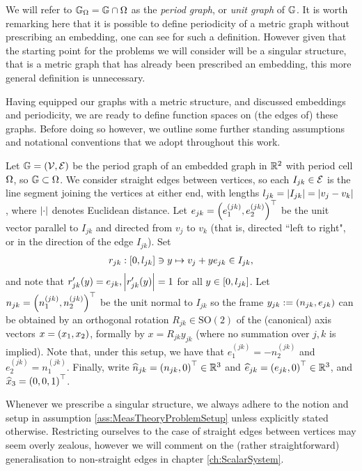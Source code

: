 We will refer to $\mathbb{G}_{\Omega} = \mathbb{G} \cap \Omega$ as the \emph{period graph}, or \emph{unit graph} of $\mathbb{G}$.
It is worth remarking here that it is possible to define periodicity of a metric graph without prescribing an embedding, one can see \cite[Chapter~4]{berkolaiko2013introduction} for such a definition.
However given that the starting point for the problems we will consider will be a singular structure, that is a metric graph that has already been prescribed an embedding, this more general definition is unnecessary.

Having equipped our graphs with a metric structure, and discussed embeddings and periodicity, we are ready to define function spaces on (the edges of) these graphs.
Before doing so however, we outline some further standing assumptions and notational conventions that we adopt throughout this work.
\begin{assumption} \label{ass:MeasTheoryProblemSetup}
	Let $\mathbb{G}=\left( \mathcal{V},\mathcal{E} \right)$ be the period graph of an embedded graph in $\mathbb{R}^2$ with period cell $\Omega$, so $\mathbb{G}\subset\Omega$.
	We consider straight edges between vertices, so each $I_{jk}\in \mathcal{E}$ is the line segment joining the vertices at either end, with lengths $l_{jk} = \left\lvert I_{jk} \right\rvert = \left\lvert v_j-v_k \right\rvert$, where $\left\lvert \cdot \right\rvert$ denotes Euclidean distance.
	Let $e_{jk} = \left( e_1^{(jk)}, e_2^{(jk)} \right)^\top$ be the unit vector parallel to $I_{jk}$ and directed from $v_j$ to $v_k$ (that is, directed ``left to right", or in the direction of the edge $I_{jk}$).
	Set
	\begin{align} \label{eq:EdgeParameterisation}
		r_{jk}:\left[ 0, l_{jk} \right] \ni y \mapsto v_j + ye_{jk} \in I_{jk},
	\end{align}
	and note that $r_{jk}'(y) = e_{jk}, \left\lvert r_{jk}'(y) \right\rvert=1$ for all $y\in\left[ 0, l_{jk} \right]$.
	Let $n_{jk} = \left( n_1^{(jk)}, n_2^{(jk)} \right)^\top$ be the unit normal to $I_{jk}$ so the frame $y_{jk} := \left( n_{jk}, e_{jk} \right)$ can be obtained by an orthogonal rotation $R_{jk}\in\mathrm{SO}(2)$ of the (canonical) axis vectors $x = \left( x_1, x_2 \right)$, formally by $x = R_{jk}y_{jk}$ (where no summation over $j,k$ is implied).
	Note that, under this setup, we have that $e_1^{(jk)} = - n_2^{(jk)}$ and $e_2^{(jk)} = n_1^{(jk)}$.
	Finally, write $\widehat{n}_{jk} = \left(  n_{jk}, 0  \right)^\top\in\mathbb{R}^3$ and $\widehat{e}_{jk} = \left(  e_{jk}, 0  \right)^\top\in\mathbb{R}^3$, and $\widehat{x}_3 = \left( 0,0,1 \right)^\top$.
\end{assumption}
Whenever we prescribe a singular structure, we always adhere to the notion and setup in assumption \ref{ass:MeasTheoryProblemSetup} unless explicitly stated otherwise.
Restricting ourselves to the case of straight edges between vertices may seem overly zealous, however we will comment on the (rather straightforward) generalisation to non-straight edges in chapter \ref{ch:ScalarSystem}.

